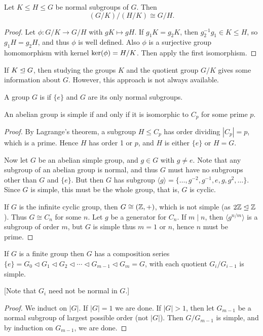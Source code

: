 \documentclass[a4paper]{scrartcl}
\begin{document}
\begin{corollary}
	Let $K \leq H \leq G$ be normal subgroups of $G$. Then
	$$
	(G/K) / (H/K) \cong G/H.
	$$
\end{corollary}
\begin{proof}
	Let $\phi: G/K \rightarrow G/H$ with $gK \mapsto gH$. If $g_1K = g_2 K$, then $g_2^{-1}g_1 \in K \leq H$, so $g_1 H = g_2 H$, and thus $\phi$ is well defined. Also $\phi$ is a surjective group homomorphism with kernel $\operatorname{ker}(\phi) = H/K$. Then apply the first isomorphism.
\end{proof}


If $K \trianglelefteq G$, then studying the groups $K$ and the quotient group $G/K$ gives some information about $G$. However, this approach is not always available.

\begin{definition}
	A group $G$ is  if $\{e\}$ and $G$ are its only normal subgroups.
\end{definition}

\begin{lemma}
	An abelian group is simple if and only if it is isomorphic to $C_p$ for some prime $p$.
\end{lemma}
\begin{proof}
	By Lagrange's theorem, a subgroup $H \leq C_p$ has order dividing $|C_p| = p$, which is a prime. Hence $H$ has order 1 or $p$, and $H$ is either $\{e\}$ or $H = G$.

	Now let $G$ be an abelian simple group, and $g \in G$ with $g \neq e$. Note that any subgroup of an abelian group is normal, and thus $G$ must have no subgroups other than $G$ and $\{e\}$. But then $G$ has subgroup $\langle g \rangle = \{\dots, g^{-2}, g^{-1}, e, g, g^2, \dots \}$. Since $G$ is simple, this must be the whole group, that is, $G$ is cyclic.

	If $G$ is the infinite cyclic group, then $G \cong (\mathbb{Z}, +)$, which is not simple (as $2 \mathbb{Z} \trianglelefteq \mathbb{Z}$). Thus $G \cong C_n$ for some $n$. Let $g$ be a generator for $C_n$. If $m \mid n$, then $\langle g^{n/m} \rangle$ is a subgroup of order $m$, but $G$ is simple thus $m = 1$ or $n$, hence $n$ must be prime.
\end{proof}

\begin{lemma}
	If $G$ is a finite group then $G$ has a composition series $\{e\} = G_0 \triangleleft G_1 \triangleleft G_2 \triangleleft \cdots \triangleleft G_{m- 1} \triangleleft G_m = G$, with each quotient $G_i / G_{i - 1}$ is simple.

	[Note that $G_i$ need not be normal in $G$.]
\end{lemma}
\begin{proof}
	We induct on $|G|$. If $|G| = 1$ we are done. If $|G| > 1$, then let $G_{m - 1}$ be a normal subgroup of largest possible order (not $|G|$). Then $G/G_{m - 1}$ is simple, and by induction on $G_{m - 1}$, we are done.
\end{proof}
\end{document}

